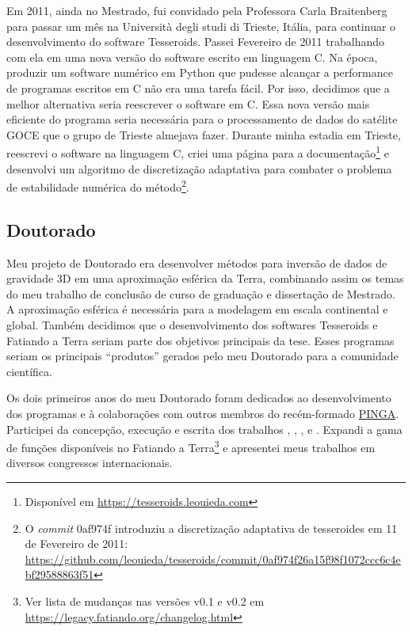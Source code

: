 \documentclass[10pt,a4paper,oneside]{book}
\newcommand{\Trieste}{Università degli studi di Trieste}
\begin{document}
Em 2011, ainda no Mestrado, fui convidado pela Professora Carla Braitenberg
para passar um mês na \Trieste{}, Itália, para continuar
o desenvolvimento do software Tesseroids.
Passei Fevereiro de 2011 trabalhando com ela em uma nova versão do software
escrito em linguagem C.
Na época, produzir um software numérico em Python que pudesse alcançar a
performance de programas escritos em C não era uma tarefa fácil.
Por isso, decidimos que a melhor alternativa seria reescrever o software em C.
Essa nova versão mais eficiente do programa seria necessária para o
processamento de dados do satélite GOCE que o grupo de Trieste almejava fazer.
Durante minha estadia em Trieste, reescrevi o software na linguagem C, criei
uma página para a documentação\footnote{Disponível em \url{https://tesseroids.leouieda.com}}
e desenvolvi um algoritmo de discretização adaptativa para combater o problema
de estabilidade numérica do método\footnote{O \textit{commit} 0af974f
introduziu a discretização adaptativa de tesseroides em 11 de Fevereiro de
2011:
\url{https://github.com/leouieda/tesseroids/commit/0af974f26a15f98f1072ccc6c4ebf29588863f51}}.

\subsection{Doutorado}
\label{sec_doutorado}

Meu projeto de Doutorado era desenvolver métodos para inversão de dados de
gravidade 3D em uma aproximação esférica da Terra, combinando assim os temas
do meu trabalho de conclusão de curso de graduação e dissertação de Mestrado.
A aproximação esférica é necessária para a modelagem em escala continental e
global.
Também decidimos que o desenvolvimento dos softwares Tesseroids e Fatiando a
Terra seriam parte dos objetivos principais da tese.
Esses programas seriam os principais ``produtos'' gerados pelo meu Doutorado
para a comunidade científica.

Os dois primeiros anos do meu Doutorado foram dedicados ao desenvolvimento dos
programas e à colaborações com outros membros do recém-formado
\href{https://www.pinga-lab.org}{PINGA}.
Participei da concepção, execução e escrita dos trabalhos
\citet{OliveiraJr2013}, \citet{Melo2013}, \citet{Carlos2014},
\citet{OliveiraJr2015} e \citet{Carlos2016}.
Expandi a gama de funções disponíveis no Fatiando a Terra\footnote{Ver lista
de mudanças nas versões v0.1 e v0.2 em \url{https://legacy.fatiando.org/changelog.html}}
e apresentei meus trabalhos em diversos congressos internacionais.
\end{document}
